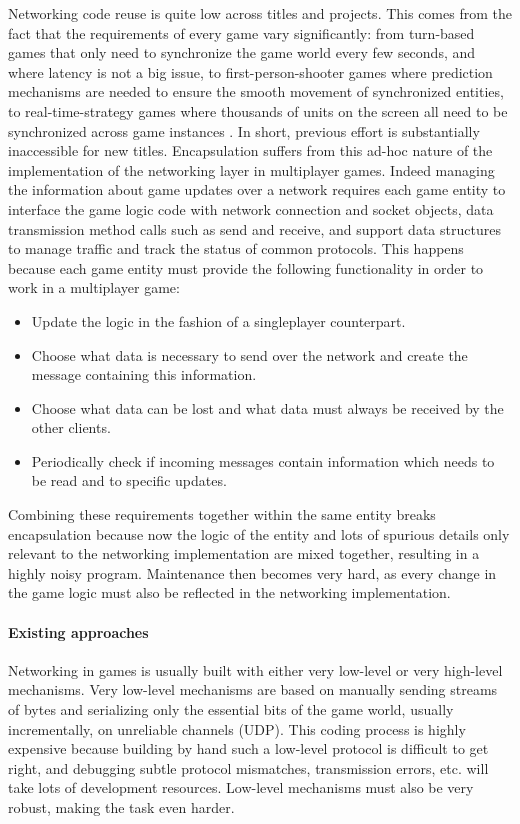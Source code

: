 Networking code reuse is quite low across titles and projects. This comes from the fact that the requirements of every game vary significantly: from turn-based games that only need to synchronize the game world every few seconds, and where latency is not a big issue, to first-person-shooter games where prediction mechanisms are needed to ensure the smooth movement of synchronized entities, to real-time-strategy games where thousands of units on the screen all need to be synchronized across game instances \cite{smed2002aspects}. In short, previous effort is substantially inaccessible for new titles. Encapsulation suffers from this ad-hoc nature of the implementation of the networking layer in multiplayer games. Indeed managing the information about game updates over a network requires each game entity to interface the game logic code with network connection and socket objects, data transmission method calls such as send and receive, and support data structures to manage traffic and track the status of common protocols. This happens because each game entity must provide the following functionality in order to work in a multiplayer game:

\begin{itemize}
	\item Update the logic in the fashion of a singleplayer counterpart.
	\item Choose what data is necessary to send over the network and create the message containing this information.
	\item Choose what data can be lost and what data must always be received by the other clients.
	\item Periodically check if incoming messages contain information which needs to be read and to specific updates.
\end{itemize}

Combining these requirements together within the same entity breaks encapsulation because now the logic of the entity and lots of spurious details only relevant to the networking implementation are mixed together, resulting in a highly noisy program. Maintenance then becomes very hard, as every change in the game logic must also be reflected in the networking implementation.

\paragraph{Existing approaches}
Networking in games is usually built with either very low-level or very high-level mechanisms. Very low-level mechanisms are based on manually sending streams of bytes and serializing only the essential bits of the game world, usually incrementally, on unreliable channels (UDP). This coding process is highly expensive because building by hand such a low-level protocol is difficult to get right, and debugging subtle protocol mismatches, transmission errors, etc. will take lots of development resources. Low-level mechanisms must also be very robust, making the task even harder.

